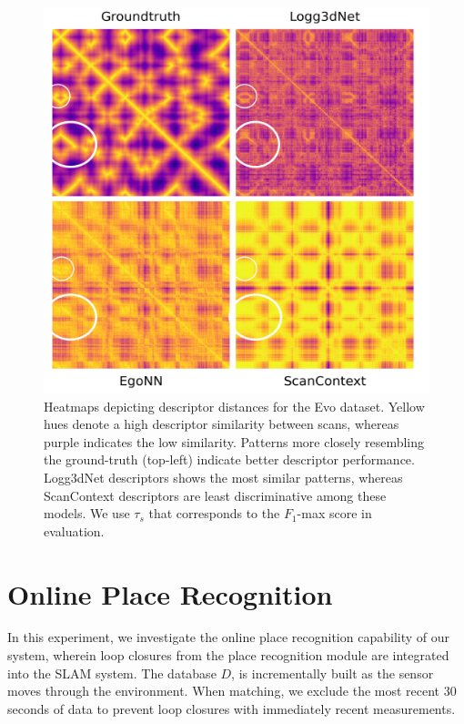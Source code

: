 \begin{figure}[t]
  \centering
  \includegraphics[width=0.99\linewidth]{pics/exp_1.2_heatmap_evo12_plasma_edit}
  \caption{Heatmaps depicting descriptor distances for the Evo dataset. Yellow hues denote a high descriptor similarity between scans, whereas purple indicates the low similarity. Patterns more closely resembling the ground-truth (top-left) indicate better descriptor performance. Logg3dNet descriptors shows the most similar patterns, whereas ScanContext descriptors are least discriminative among these models. We use $\tau_{s}$ that corresponds to the $F_1$-max score in evaluation.}
  \label{fig:heatmap_evo12}
\end{figure}



\section{Online Place Recognition}
\label{sec:exp_online_slam}
In this experiment, we investigate the online place recognition capability of our system, wherein loop closures from the place recognition module are integrated into the SLAM system. The database $D$, is incrementally built as the sensor moves through the environment. When matching, we exclude the most recent 30 seconds of data to prevent loop closures with immediately recent measurements.
